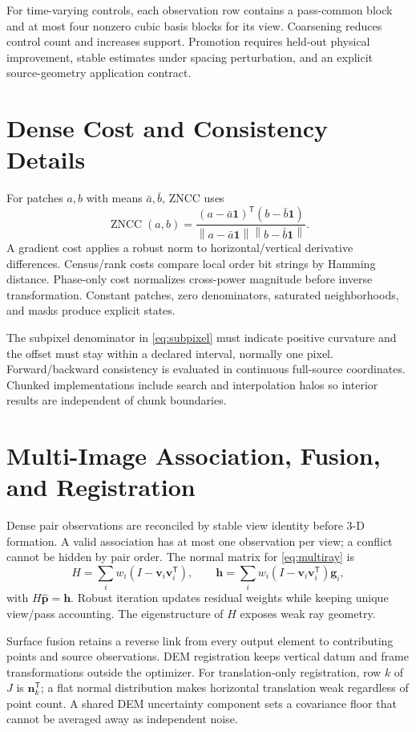 \documentclass[journal]{IEEEtran}
\newcommand{\T}{^{\mathsf T}}
\newcommand{\norm}[1]{\left\lVert #1\right\rVert}
\begin{document}
For time-varying controls, each observation row contains a pass-common block and
at most four nonzero cubic basis blocks for its view. Coarsening reduces control
count and increases support. Promotion requires held-out physical improvement,
stable estimates under spacing perturbation, and an explicit source-geometry
application contract.

\section{Dense Cost and Consistency Details}

For patches $a,b$ with means $\bar a,\bar b$, ZNCC uses
\begin{equation}
\operatorname{ZNCC}(a,b)=
\frac{(a-\bar a\bm1)\T(b-\bar b\bm1)}
{\norm{a-\bar a\bm1}\norm{b-\bar b\bm1}}.
\end{equation}
A gradient cost applies a robust norm to horizontal/vertical derivative
differences. Census/rank costs compare local order bit strings by Hamming
distance. Phase-only cost normalizes cross-power magnitude before inverse
transformation. Constant patches, zero denominators, saturated neighborhoods,
and masks produce explicit states.

The subpixel denominator in \eqref{eq:subpixel} must indicate positive
curvature and the offset must stay within a declared interval, normally one
pixel. Forward/backward consistency is evaluated in continuous full-source
coordinates. Chunked implementations include search and interpolation halos so
interior results are independent of chunk boundaries.

\section{Multi-Image Association, Fusion, and Registration}

Dense pair observations are reconciled by stable view identity before 3-D
formation. A valid association has at most one observation per view; a conflict
cannot be hidden by pair order. The normal matrix for \eqref{eq:multiray} is
\begin{equation}
H=\sum_i w_i(I-\bm v_i\bm v_i\T),\qquad
\bm h=\sum_i w_i(I-\bm v_i\bm v_i\T)\bm g_i,
\end{equation}
with $H\widehat{\bm p}=\bm h$. Robust iteration updates residual weights while
keeping unique view/pass accounting. The eigenstructure of $H$ exposes weak
ray geometry.

Surface fusion retains a reverse link from every output element to contributing
points and source observations. DEM registration keeps vertical datum and
frame transformations outside the optimizer. For translation-only registration,
row $k$ of $J$ is $\bm n_k\T$; a flat normal distribution makes horizontal
translation weak regardless of point count. A shared DEM uncertainty component
sets a covariance floor that cannot be averaged away as independent noise.
\end{document}
